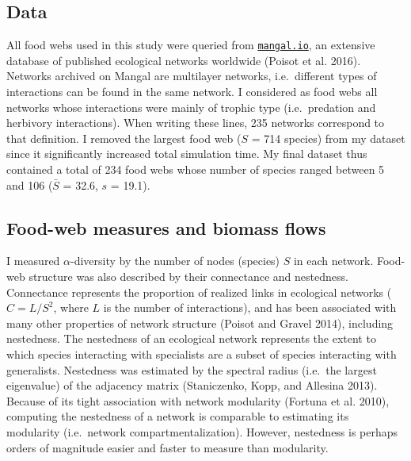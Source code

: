\documentclass[10pt,oneside]{article}
\begin{document}
\hypertarget{data}{%
\subsection{Data}\label{data}}

All food webs used in this study were queried from
\href{https://mangal.io/\#/}{\texttt{mangal.io}}, an extensive database
of published ecological networks worldwide (Poisot et al. 2016).
Networks archived on Mangal are multilayer networks, i.e.~different
types of interactions can be found in the same network. I considered as
food webs all networks whose interactions were mainly of trophic type
(i.e.~predation and herbivory interactions). When writing these lines,
235 networks correspond to that definition. I removed the largest food
web (\(S\) = 714 species) from my dataset since it significantly
increased total simulation time. My final dataset thus contained a total
of 234 food webs whose number of species ranged between 5 and 106
(\(\bar{S}\) = 32.6, \(s\) = 19.1).

\hypertarget{food-web-measures-and-biomass-flows}{%
\subsection{Food-web measures and biomass
flows}\label{food-web-measures-and-biomass-flows}}

I measured \(\alpha\)-diversity by the number of nodes (species) \(S\)
in each network. Food-web structure was also described by their
connectance and nestedness. Connectance represents the proportion of
realized links in ecological networks (\(C=L/S^2\), where \(L\) is the
number of interactions), and has been associated with many other
properties of network structure (Poisot and Gravel 2014), including
nestedness. The nestedness of an ecological network represents the
extent to which species interacting with specialists are a subset of
species interacting with generalists. Nestedness was estimated by the
spectral radius (i.e.~the largest eigenvalue) of the adjacency matrix
(Staniczenko, Kopp, and Allesina 2013). Because of its tight association
with network modularity (Fortuna et al. 2010), computing the nestedness
of a network is comparable to estimating its modularity (i.e.~network
compartmentalization). However, nestedness is perhaps orders of
magnitude easier and faster to measure than modularity.
\end{document}
